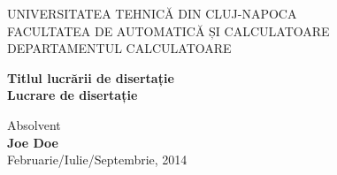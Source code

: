 \documentclass[12pt,a4paper,twoside]{report}
\begin{document}
\begin{titlepage}
\begin{center}
UNIVERSITATEA TEHNICĂ DIN CLUJ-NAPOCA\\
FACULTATEA DE AUTOMATICĂ ȘI CALCULATOARE\\
DEPARTAMENTUL CALCULATOARE\\

\vspace{6cm}

\Huge {\textbf{Titlul lucrării de disertație}\\}
\vspace {1cm}
\Large \textbf{Lucrare de disertație}\\

\vspace{2cm}

\large Absolvent \\ \textbf{Joe Doe}\\

Februarie/Iulie/Septembrie, 2014\\
\end{center}
\end{titlepage}

\begin{titlepage}
\phantom{1}
\end{titlepage}
\end{document}
